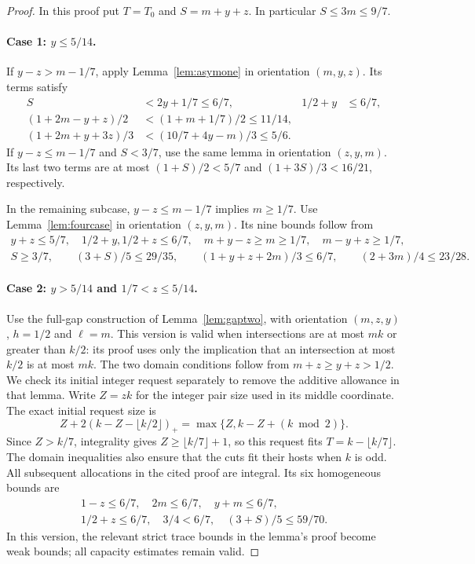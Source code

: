 \documentclass[11pt]{article}
\numberwithin{equation}{section}
\theoremstyle{definition}
\theoremstyle{remark}
\begin{document}
\begin{proof}
In this proof put $T=T_0$ and $S=m+y+z$. In particular
$S\le3m\le9/7$.

\paragraph{Case 1: $y\le5/14$.}
If $y-z>m-1/7$, apply Lemma~\ref{lem:asymone} in orientation
$(m,y,z)$. Its terms satisfy
\begin{align*}
 S&<2y+1/7\le6/7,&1/2+y&\le6/7,\\
 (1+2m-y+z)/2&<(1+m+1/7)/2\le11/14,\\
 (1+2m+y+3z)/3&<(10/7+4y-m)/3\le5/6.
\end{align*}
If $y-z\le m-1/7$ and $S<3/7$, use the same lemma in orientation
$(z,y,m)$. Its last two terms are at most $(1+S)/2<5/7$ and
$(1+3S)/3<16/21$, respectively.

In the remaining subcase, $y-z\le m-1/7$ implies $m\ge1/7$.
Use Lemma~\ref{lem:fourcase} in orientation $(z,y,m)$. Its nine bounds
follow from
\begin{gather*}
 y+z\le5/7,\quad 1/2+y, 1/2+z\le6/7,\quad
 m+y-z\ge m\ge1/7,\quad m-y+z\ge1/7,\\
 S\ge3/7,\qquad (3+S)/5\le29/35,\qquad
 (1+y+z+2m)/3\le6/7,\qquad (2+3m)/4\le23/28.
\end{gather*}

\paragraph{Case 2: $y>5/14$ and $1/7<z\le5/14$.}
Use the full-gap construction of Lemma~\ref{lem:gaptwo}, with orientation
$(m,z,y)$, $h=1/2$ and $\ell=m$. This version is valid when intersections
are at most $mk$ or greater than $k/2$: its proof uses only the implication
that an intersection at most $k/2$ is at most $mk$. The two domain
conditions follow from $m+z\ge y+z>1/2$. We check its initial integer
request separately to remove the additive allowance in that lemma.
Write $Z=zk$ for the integer pair size used in its middle coordinate.
The exact initial request size is
\[
 Z+2(k-Z-\lfloor k/2\rfloor)_+
   =\max\{Z,k-Z+(k\bmod2)\}.
\]
Since $Z>k/7$, integrality gives $Z\ge\lfloor k/7\rfloor+1$, so
this request fits $T=k-\lfloor k/7\rfloor$. The domain inequalities
also ensure that the cuts fit their hosts when $k$ is odd. All subsequent
allocations in the cited proof are integral. Its six homogeneous bounds
are
\[
 \begin{gathered}
 1-z\le6/7,\quad 2m\le6/7,\quad y+m\le6/7,\\
 1/2+z\le6/7,\quad 3/4<6/7,\quad (3+S)/5\le59/70.
 \end{gathered}
\]
In this version, the relevant strict trace bounds in the lemma's proof
become weak bounds; all capacity estimates remain valid.


\end{proof}
\end{document}
